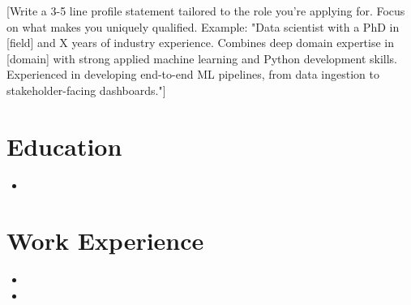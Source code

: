 \documentclass[11pt,a4paper,sans]{moderncv}
\begin{document}
\makecvtitle


\vspace{6pt}
\small{[Write a 3-5 line profile statement tailored to the role you're applying for. Focus on what makes you uniquely qualified. Example: "Data scientist with a PhD in [field] and X years of industry experience. Combines deep domain expertise in [domain] with strong applied machine learning and Python development skills. Experienced in developing end-to-end ML pipelines, from data ingestion to stakeholder-facing dashboards."]}


\section{Education}
\vspace{1pt}
\begin{itemize}

\item{}

\end{itemize}


\section{Work Experience}
\vspace{3pt}
\begin{itemize}

\item{}

\vspace{3pt}

\item{}

\end{itemize}
\end{document}
